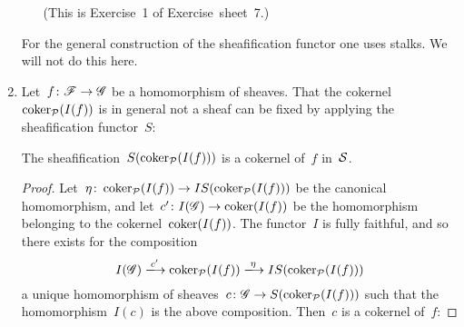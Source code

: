\begin{example}
\begin{enumerate}
\begin{examplenonum}[Sheafificaton]
\begin{enumerate}
            (This is Exercise~1 of Exercise~sheet~7.)
        \end{enumerate}
      \end{examplenonum}
      
      For the general construction of the sheafification functor one uses stalks.
      We will not do this here.
      
    \item
      Let~$f \colon \mathscr{F} \to \mathscr{G}$ be a homomorphism of sheaves.
      That the cokernel~$\operatorname{coker}_{\mathcal{P}}(I(f))$ is in general not a sheaf can be fixed by applying the sheafification functor~$S$:
      
      \begin{claimnonum}
        The sheafification~$S(\operatorname{coker}_{\mathcal{P}}(I(f)))$ is a cokernel of~$f$ in~$\mathcal{S}$.
      \end{claimnonum}
      
      \begin{proof}
        Let~$\eta \colon \operatorname{coker}_{\mathcal{P}}(I(f)) \to IS( \operatorname{coker}_{\mathcal{P}}(I(f)) )$ be the canonical homomorphism, and let~$c' \colon I(\mathscr{G}) \to \operatorname{coker}(I(f))$ be the homomorphism belonging to the cokernel~$\operatorname{coker}(I(f))$.
        The functor~$I$ is fully faithful, and so there exists for the composition
        \[
                          I(\Gs)
          \xlongto{c'}    \coker_{\Pcat}(I(f))
          \xlongto{\eta}  IS(\coker_{\Pcat}(I(f)))
        \]
        a unique homomorphism of sheaves~$c \colon \mathscr{G} \to S(\operatorname{coker}_{\mathcal{P}}(I(f)))$ such that the homomorphism~$I(c)$ is the above composition.
        Then~$c$ is a cokernel of~$f$:
        

\end{proof}
\end{enumerate}
\end{example}
